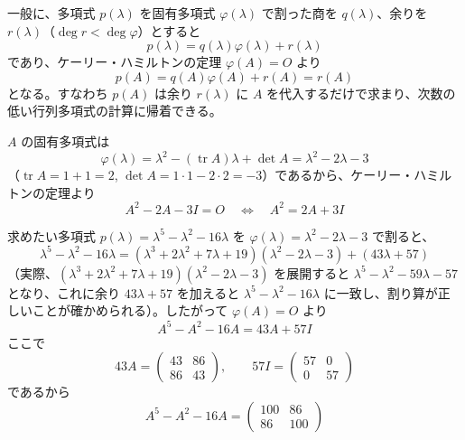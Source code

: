
一般に、多項式 $p(\lambda)$ を固有多項式 $\varphi(\lambda)$ で割った商を $q(\lambda)$、余りを $r(\lambda)$（$\deg r < \deg \varphi$）とすると
\[
p(\lambda) = q(\lambda)\varphi(\lambda) + r(\lambda)
\]
であり、ケーリー・ハミルトンの定理 $\varphi(A) = O$ より
\[
p(A) = q(A)\varphi(A) + r(A) = r(A)
\]
となる。すなわち $p(A)$ は余り $r(\lambda)$ に $A$ を代入するだけで求まり、次数の低い行列多項式の計算に帰着できる。

$A$ の固有多項式は
\[
\varphi(\lambda) = \lambda^{2} - (\operatorname{tr} A)\lambda + \det A = \lambda^{2} - 2\lambda - 3
\]
（$\operatorname{tr} A = 1+1=2$, $\det A = 1\cdot1 - 2\cdot2 = -3$）であるから、ケーリー・ハミルトンの定理より
\[
A^{2} - 2A - 3I = O \quad\Longleftrightarrow\quad A^{2} = 2A + 3I
\]

求めたい多項式 $p(\lambda) = \lambda^{5} - \lambda^{2} - 16\lambda$ を $\varphi(\lambda) = \lambda^{2} - 2\lambda - 3$ で割ると、
\[
\lambda^{5} - \lambda^{2} - 16\lambda = (\lambda^{3} + 2\lambda^{2} + 7\lambda + 19)(\lambda^{2} - 2\lambda - 3) + (43\lambda + 57)
\]
（実際、$(\lambda^{3}+2\lambda^{2}+7\lambda+19)(\lambda^{2}-2\lambda-3)$ を展開すると $\lambda^{5} - \lambda^{2} - 59\lambda - 57$ となり、これに余り $43\lambda+57$ を加えると $\lambda^{5} - \lambda^{2} - 16\lambda$ に一致し、割り算が正しいことが確かめられる）。したがって $\varphi(A) = O$ より
\[
A^{5} - A^{2} - 16A = 43A + 57I
\]
ここで
\[
43A = \begin{pmatrix} 43 & 86 \\ 86 & 43 \end{pmatrix}, \qquad 57I = \begin{pmatrix} 57 & 0 \\ 0 & 57 \end{pmatrix}
\]
であるから
\[
\boxed{\; A^{5} - A^{2} - 16A = \begin{pmatrix} 100 & 86 \\ 86 & 100 \end{pmatrix} \;}
\]


